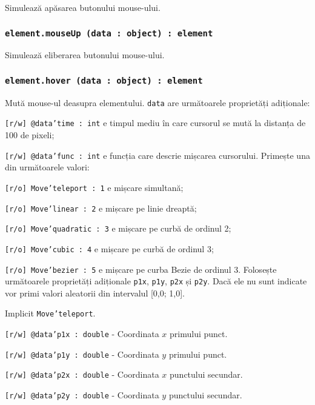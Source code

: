 Simulează apăsarea butonului mouse-ului.

\subsubsection{\texttt{element.mouseUp (data : object) : element}}

Simulează eliberarea butonului mouse-ului.

\subsubsection{\texttt{element.hover (data : object) : element}}

Mută mouse-ul deasupra elementului. \texttt{data} are următoarele proprietăți adiționale:
\begin{icItems}
	\item \texttt{[r/w] @data'time : int} e timpul mediu în care cursorul se mută la distanța de 100 de pixeli;
	\item \texttt{[r/w] @data'func : int} e funcția care descrie mișcarea cursorului. Primește una din următoarele valori:
	\begin{icItems}
		\item \texttt{[r/o] Move'teleport : 1} e mișcare simultană;
		\item \texttt{[r/o] Move'linear : 2} e mișcare pe linie dreaptă;
		\item \texttt{[r/o] Move'quadratic : 3} e mișcare pe curbă de ordinul 2;
		\item \texttt{[r/o] Move'cubic : 4} e mișcare pe curbă de ordinul 3;
		\item \texttt{[r/o] Move'bezier : 5} e mișcare pe curba Bezie de ordinul 3. Folosește următoarele proprietăți adiționale \texttt{p1x}, \texttt{p1y}, \texttt{p2x} și \texttt{p2y}. Dacă ele nu sunt indicate vor primi valori aleatorii din intervalul [0,0; 1,0].
	\end{icItems}
	Implicit \texttt{Move'teleport}.
	\item \texttt{[r/w] @data'p1x : double} - Coordinata $x$ primului punct.
	\item \texttt{[r/w] @data'p1y : double} - Coordinata $y$ primului punct.
	\item \texttt{[r/w] @data'p2x : double} - Coordinata $x$ punctului secundar.
	\item \texttt{[r/w] @data'p2y : double} - Coordinata $y$ punctului secundar.
\end{icItems}

